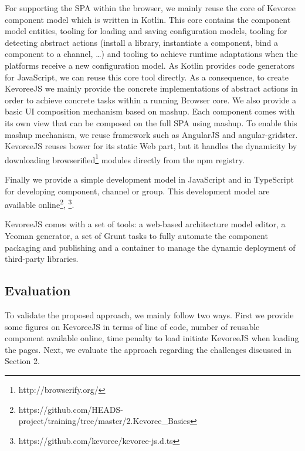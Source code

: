 For supporting the SPA within the browser, we mainly reuse the core of Kevoree component model which is written in Kotlin. This core contains the component model entities, tooling for loading and saving configuration models, tooling for detecting abstract actions (install a library, instantiate a component, bind a component to a channel, …)  and tooling to achieve runtime adaptations when the platforms receive a new configuration model. As Kotlin provides code generators for JavaScript, we can reuse this core tool directly. As a consequence, to create KevoreeJS we mainly provide the concrete implementations of abstract actions in order to achieve concrete tasks within a running Browser core. We also provide a basic UI composition mechanism based on mashup. Each component comes with its own view that can be composed on the full SPA using mashup. To enable this mashup mechanism, we reuse framework such as AngularJS and angular-gridster. KevoreeJS reuses bower for its static Web part, but it handles the dynamicity by downloading browserified\footnote{http://browserify.org/} modules directly from the npm registry. 


Finally we provide a simple development model in JavaScript and in TypeScript for developing component, channel or  group. This development model are available online\footnote{ https://github.com/HEADS-project/training/tree/master/2.Kevoree\_Basics}, \footnote{https://github.com/kevoree/kevoree-js.d.ts }.  

KevoreeJS comes with a set of tools: a web-based architecture model editor, a Yeoman generator, a set of Grunt tasks to fully automate the component packaging and publishing and a container to manage the dynamic deployment of third-party libraries. 

\subsection{Evaluation} 
To validate the proposed approach, we mainly follow two ways. First we provide some figures on KevoreeJS in terms of line of code, number of reusable component available online, time penalty to load initiate KevoreeJS when loading the pages. Next, we evaluate the approach regarding the challenges discussed in Section 2. 

